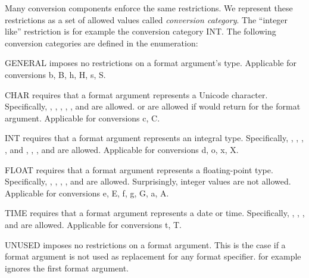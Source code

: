 \noindent Many conversion components enforce the same restrictions. We represent
these restrictions as a set of allowed values called \emph{conversion
category}. The ``integer like'' restriction is for example the conversion
category INT.  The following conversion categories are defined in the
 enumeration:

\begin{description}
\item{GENERAL} imposes no restrictions on a format argument's type. Applicable for
    conversions b, B, h, H, s, S.

\item{CHAR} requires that a format argument represents a Unicode character.
    Specifically, , , ,
    , , and  are allowed.
     or  are allowed if
     would return 
    for the format argument. Applicable for conversions c, C.

\item{INT} requires that a format argument represents an integral type. Specifically,
    , , , ,
     and , ,
    , and  are allowed. Applicable for
    conversions d, o, x, X.  

\item{FLOAT} requires that a format argument represents a floating-point type.  Specifically,
    , , ,
    , and  are allowed. Surprisingly, integer
    values are not allowed. Applicable for
    conversions e, E, f, g, G, a, A.
 
\item{TIME} requires that a format argument represents a date or time.
    Specifically, , , , and
     are allowed.  Applicable for conversions t, T.

\item{UNUSED} imposes no restrictions on a format argument. This is the case if a
    format argument is not used as replacement for any format specifier.
     for example ignores the first format argument. 
\end{description}

